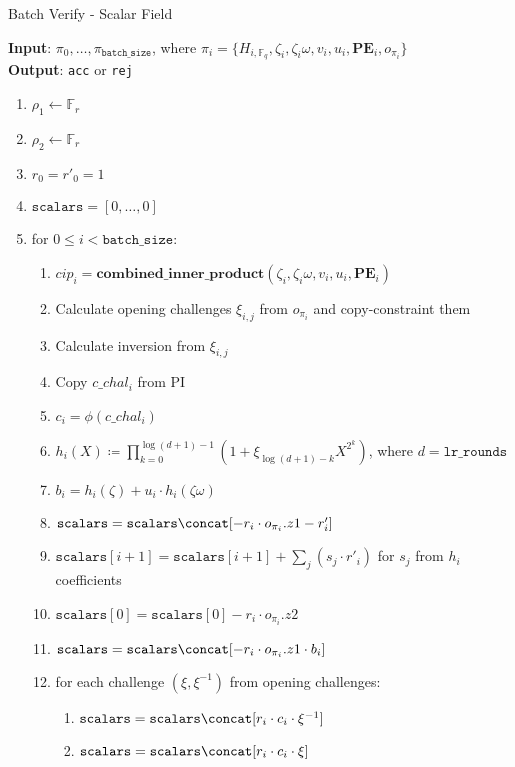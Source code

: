 \begin{algorithm}[H]
    \caption{Batch Verify - Scalar Field}
    \textbf{Input}: $\pi_0, \dots, \pi_{\texttt{batch\_size}}$, where $\pi_i = \{H_{i, \mathbb{F}_q}, \zeta_i, \zeta_i\omega, v_i, u_i,
    \textbf{PE}_i, o_{\pi_i} \}$ \\
    \textbf{Output}: \texttt{acc} or \texttt{rej}
    \begin{enumerate}
        \item $\rho_1 \leftarrow \mathbb{F}_r$
        \item $\rho_2 \leftarrow \mathbb{F}_r$
        \item $r_0 = r'_0 = 1$
        \item $\texttt{scalars} = [0, \dots, 0]$
        \item for $0 \leq i < \texttt{batch\_size}$:
        \begin{enumerate}
            \item $cip_i = \textbf{combined\_inner\_product}(\zeta_i, \zeta_i\omega, v_i, u_i, \textbf{PE}_i)$
            \item Calculate opening challenges $\xi_{i, j}$ from $o_{\pi_i}$ and copy-constraint them
            \item Calculate inversion from $\xi_{i, j}$
	   \item Copy $c\_chal_i$ from PI
            \item $c_i = \phi(c\_chal_i)$
            \item $h_i(X) \coloneqq \prod_{k=0}^{\log(d+1) - 1}(1 + \xi_{\log(d+1)-k}X^{2^k})$, where $d = \texttt{lr\_rounds}$
            \item $b_i = h_i(\zeta) + u_i \cdot h_i(\zeta\omega)$
	   \item $\texttt{scalars} = \texttt{scalars} \concat [-r_i \cdot o_{\pi_i}.z1 - r'_i]$
	   \item $\texttt{scalars}[i + 1] = \texttt{scalars}[i + 1] + \sum_j(s_j \cdot r'_i)$ for $s_j$ from $h_i$ coefficients
	   \item $\texttt{scalars}[0] = \texttt{scalars}[0] - r_i \cdot o_{\pi_i}.z2$
	   \item $\texttt{scalars} = \texttt{scalars} \concat [-r_i \cdot o_{\pi_i}.z1 \cdot b_i]$
            \item for each challenge $(\xi, \xi^{-1})$ from opening challenges:
	   \begin{enumerate}
		\item $\texttt{scalars} = \texttt{scalars} \concat [r_i \cdot c_i \cdot \xi^{-1}]$
		\item $\texttt{scalars} = \texttt{scalars} \concat [r_i \cdot c_i \cdot \xi]$

\end{enumerate}
\end{enumerate}
\end{enumerate}
\end{algorithm}
